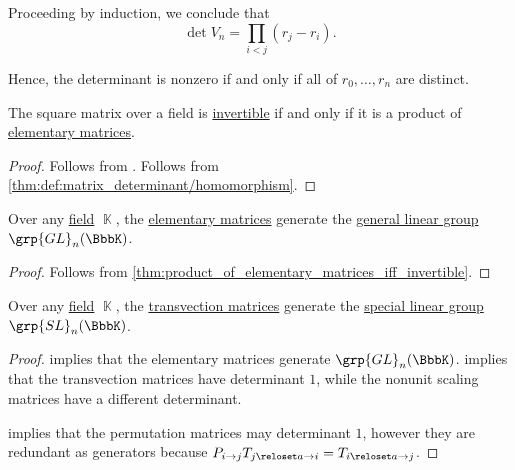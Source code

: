 \begin{example}
  Proceeding by induction, we conclude that
  \begin{equation}\label{eq:ex:vandermonde_matrix/determinant}
    \det V_n = \prod_{i < j} (r_j - r_i).
  \end{equation}

  Hence, the determinant is nonzero if and only if all of \( r_0, \ldots, r_n \) are distinct.
\end{example}

\begin{proposition}\label{thm:product_of_elementary_matrices_iff_invertible}
  The square matrix over a field is \hyperref[def:inverse_matrix]{invertible} if and only if it is a product of \hyperref[def:elementary_matrix]{elementary matrices}.
\end{proposition}
\begin{proof}
  \SufficiencySubProof Follows from .
  \NecessitySubProof Follows from \cref{thm:def:matrix_determinant/homomorphism}.
\end{proof}

\begin{corollary}\label{thm:elementary_matrices_generate_gln}
  Over any \hyperref[def:field]{field} \( \BbbK \), the \hyperref[def:elementary_matrix]{elementary matrices} generate the \hyperref[def:linear_groups]{general linear group} \( \grp{GL}_n(\BbbK) \).
\end{corollary}
\begin{proof}
  Follows from \cref{thm:product_of_elementary_matrices_iff_invertible}.
\end{proof}

\begin{corollary}\label{thm:transversion_matrices_generate_sln}
  Over any \hyperref[def:field]{field} \( \BbbK \), the \hyperref[def:elementary_matrix/transvection]{transvection matrices} generate the \hyperref[def:linear_groups]{special linear group} \( \grp{SL}_n(\BbbK) \).
\end{corollary}
\begin{proof}
   implies that the elementary matrices generate \( \grp{GL}_n(\BbbK) \).  implies that the transvection matrices have determinant \( 1 \), while the nonunit scaling matrices have a different determinant.

   implies that the permutation matrices may determinant \( 1 \), however they are redundant as generators because \( P_{i \to j} T_{j \reloset a \to i} = T_{i \reloset a \to j} \).
\end{proof}

